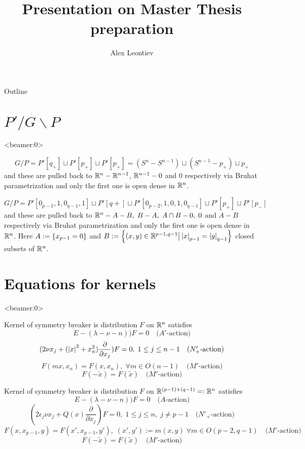 \documentclass[8pt,pdf,notes]{beamer}
\title{Presentation on Master Thesis preparation}
\author{Alex Leontiev}
\theoremstyle{mystyle}
\begin{document}
\begin{frame}\titlepage\end{frame}
\begin{frame}{Outline}
	\tableofcontents
\end{frame}

\section{$P'/G\backslash P$}
\begin{frame}<beamer:0>%
	\begin{theorem}\[G/P=P'[q_+]\sqcup P'[p_+]\sqcup P'[p_+]=
		(S^n-S^{n-1})\sqcup (S^{n-1}-{p_+})\sqcup p_+\]
		and these are pulled back to $\mathbb{R}^n-\mathbb{R}^{n-1}$, $\mathbb{R}^{n-1}-0$ and $0$ respectively via Bruhat parametrization and
		only the first one is open dense in $\mathbb{R}^n$.
\end{theorem}
\begin{theorem}[$O(p,q),\;n:=(p-1)+(q-1)$]
	\[G/P=P'[0_{p-1},1,0_{q-1},1]\sqcup P'[q+]\sqcup P'[0_{p-2},1,0,1,0_{q-1}]\sqcup P'[p_+]\sqcup P'[p_-]\]
	and these are pulled back to $\mathbb{R}^n-A-B,\;B-A,\;A\cap B-{0},\;{0}$ and $A-B$ respectively via Bruhat parametrization and
		only the first one is open dense in $\mathbb{R}^n$.
Here $A:=\left\{x_{p-1}=0\right\}$ and $B:=\left\{(x,y)\in\mathbb{R}^{p-1,q-1}\big| \left|x\right|_{p-1}=\left|y\right|_{q-1}\right\}$ closed subsets of $\mathbb{R}^n$.
\end{theorem}
\end{frame}
\section{Equations for kernels}
\begin{frame}<beamer:0>
\begin{theorem}Kernel of symmetry breaker is distribution $F$ on $\mathbb{R}^n$ satisfies
	\[E-(\lambda-\nu-n))F=0\quad\mbox{($A'$-action)}\]
\[(2\nu x_j+(\left|x\right|^2+x_n^2)\frac{\partial}{\partial x_j})F=0,\;1\leq j\leq n-1\quad\mbox{($N_+'$-action)}\]
\[F(mx,x_n)=F(x,x_n),\;\forall m\in O(n-1)\quad\mbox{($M'$-action)}\]
\[F(-\tilde{x})=F(\tilde{x})\quad\mbox{($M'$-action)}\]
\end{theorem}
\begin{theorem}Kernel of symmetry breaker is distribution $F$ on $\mathbb{R}^{(p-1)+(q-1)}=:\mathbb{R}^n$ satisfies
\[E-(\lambda-\nu-n))F=0\quad\mbox{($A$-action)}\]
\[(2\epsilon_j\nu x_j+Q(x)\frac{\partial}{\partial x_j})F=0,\;1\leq j\leq n,\;j\neq p-1\quad\mbox{
($N'_+$-action)}\]
\[F(x,x_{p-1},y)=F(x',x_{p-1},y'),\;(x',y'):=m(x,y)\;\forall m\in O(p-2,q-1)\quad\mbox{($M'$-action)}\]
\[F(-\tilde{x})=F(\tilde{x})\quad\mbox{($M'$-action)}\]
\end{theorem}
\end{frame}
\end{document}
